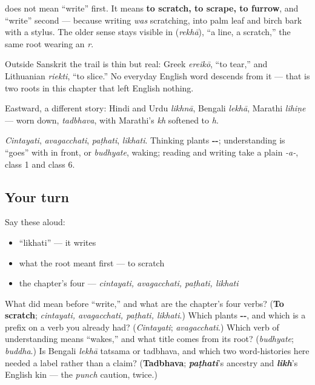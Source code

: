 \begin{cousinweb}
\textbf{} does not mean \textquotedblleft{}write\textquotedblright{} first. It means \textbf{to scratch, to scrape, to furrow}, and \textquotedblleft{}write\textquotedblright{} second — because writing \emph{was} scratching, into palm leaf and birch bark with a stylus. The older sense stays visible in \textbf{} (\emph{rekhā}), \textquotedblleft{}a line, a scratch,\textquotedblright{} the same root wearing an \emph{r}.

Outside Sanskrit the trail is thin but real: Greek \emph{ereikō}, \textquotedblleft{}to tear,\textquotedblright{} and Lithuanian \emph{riekti}, \textquotedblleft{}to slice.\textquotedblright{} No everyday English word descends from it — that is two roots in this chapter that left English nothing.

Eastward, a different story: Hindi and Urdu \emph{likhnā}, Bengali \emph{lekhā}, Marathi \emph{lihiṇe} — worn down, \emph{tadbhava}, with Marathi's \emph{kh} softened to \emph{h}.
\end{cousinweb}

\begin{grammarlens}[title={What you've built: four verbs, four ways to build a stem}]
\emph{Cintayati}, \emph{avagacchati}, \emph{paṭhati}, \emph{likhati}. Thinking plants \textbf{--}; understanding is \textquotedblleft{}goes\textquotedblright{} with \textbf{} in front, or \emph{budhyate}, waking; reading and writing take a plain \emph{-a-}, class 1 and class 6.
\end{grammarlens}

\subsection*{Your turn}
Say these aloud:

\begin{itemize}
\raggedright
  \item \textquotedblleft{}likhati\textquotedblright{} — it writes
  \item what the root meant first — to scratch
  \item the chapter's four — \emph{cintayati, avagacchati, paṭhati, likhati}
\end{itemize}

\begin{tcolorbox}[breakable,colback=teal!4,colframe=teal!35!black,title={Before you move on}]
What did \textbf{} mean before \textquotedblleft{}write,\textquotedblright{} and what are the chapter's four verbs? (\textbf{To scratch}; \emph{cintayati, avagacchati, paṭhati, likhati}.) Which plants \textbf{--}, and which is a prefix on a verb you already had? (\emph{Cintayati}; \emph{avagacchati}.) Which verb of understanding means \textquotedblleft{}wakes,\textquotedblright{} and what title comes from its root? (\emph{budhyate}; \emph{buddha}.) Is Bengali \emph{lekhā} tatsama or tadbhava, and which two word-histories here needed a label rather than a claim? (\textbf{Tadbhava}; \emph{\textbf{paṭhati}}'s ancestry and \emph{\textbf{likh}}'s English kin — the \emph{punch} caution, twice.)
\end{tcolorbox}
